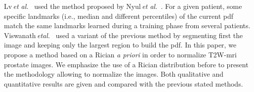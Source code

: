 Lv\,\textit{et al.}~\cite{lv2009computerized} used the method proposed by Nyul\,\textit{et al.}~\cite{nyul2000new}.
For a given patient, some specific landmarks (i.e., median and different percentiles) of the current \ac{pdf} match the same landmarks learned during a training phase from several patients.
Viswanath\,\textit{etal.}~\cite{viswanath2012central} used a variant of the previous method by segmenting first the image and keeping only the largest region to build the \ac{pdf}.
In this paper, we propose a method based on a Rician \textit{a priori} in order to normalize T2W-\ac{mri} prostate images. We emphasize the use of a Rician distribution before to present the methodology allowing to normalize the images. Both qualitative and quantitative results are given and compared with the previous stated methods.


